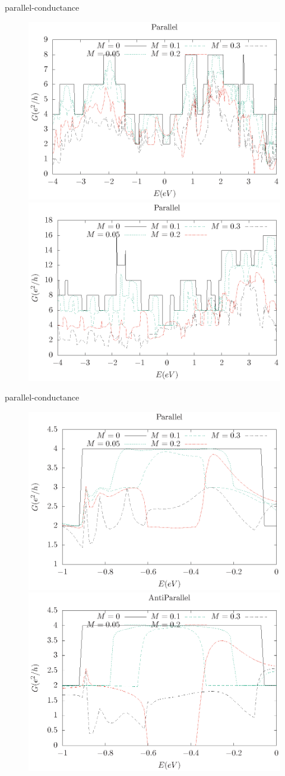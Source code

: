 \documentclass[handout,t]{beamer}
\begin{document}
\begin{frame}{parallel-conductance}
	\begin{figure}[ht]
		\centering
		\includegraphics[width=.45\linewidth]{../figures/armchair-parallel-conductance-revise-thesis.eps}
		\includegraphics[width=.45\linewidth]{../figures/zigzag-parallel-conductance-revise-thesis.eps}
	  \end{figure}
\end{frame}

\begin{frame}{parallel-conductance}
	\begin{figure}[ht]
		\centering
		\includegraphics[width=0.45\linewidth]{../figures/armchair-parallel-conductance-1to0-revise-thesis.eps}
		\includegraphics[width=0.45\linewidth]{../figures/armchair-antiparallel-conductance-1to0-revise-thesis.eps}
	  \end{figure}
\end{frame}
\end{document}
